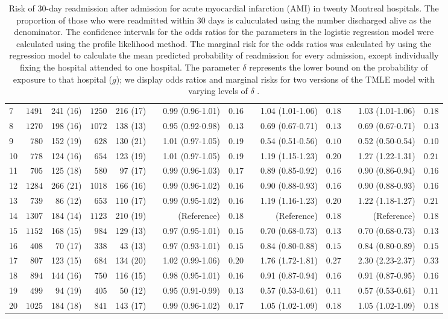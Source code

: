 \documentclass[]{article}\usepackage[]{graphicx}\usepackage[]{color}
\begin{document}
\begin{landscape}
\begin{table}[!tbp]
\begin{center}
\begin{tabular}{lrrrrcrrcrrcrr}
7&$1491$&241 (16)&$1250$&216 (17)&&0.99 (0.96-1.01)&$0.16$&&1.04 (1.01-1.06)&$0.18$&&1.03 (1.01-1.06)&$0.18$\tabularnewline
8&$1270$&198 (16)&$1072$&138 (13)&&0.95 (0.92-0.98)&$0.13$&&0.69 (0.67-0.71)&$0.13$&&0.69 (0.67-0.71)&$0.13$\tabularnewline
9&$ 780$&152 (19)&$ 628$&130 (21)&&1.01 (0.97-1.05)&$0.19$&&0.54 (0.51-0.56)&$0.10$&&0.52 (0.50-0.54)&$0.10$\tabularnewline
10&$ 778$&124 (16)&$ 654$&123 (19)&&1.01 (0.97-1.05)&$0.19$&&1.19 (1.15-1.23)&$0.20$&&1.27 (1.22-1.31)&$0.21$\tabularnewline
11&$ 705$&125 (18)&$ 580$&97 (17)&&0.99 (0.96-1.03)&$0.17$&&0.89 (0.85-0.92)&$0.16$&&0.90 (0.86-0.94)&$0.16$\tabularnewline
12&$1284$&266 (21)&$1018$&166 (16)&&0.99 (0.96-1.02)&$0.16$&&0.90 (0.88-0.93)&$0.16$&&0.90 (0.88-0.93)&$0.16$\tabularnewline
13&$ 739$&86 (12)&$ 653$&110 (17)&&0.99 (0.95-1.02)&$0.16$&&1.19 (1.16-1.23)&$0.20$&&1.22 (1.18-1.27)&$0.21$\tabularnewline
14&$1307$&184 (14)&$1123$&210 (19)&&(Reference)&$0.18$&&(Reference)&$0.18$&&(Reference)&$0.18$\tabularnewline
15&$1152$&168 (15)&$ 984$&129 (13)&&0.97 (0.95-1.01)&$0.15$&&0.70 (0.68-0.73)&$0.13$&&0.70 (0.68-0.73)&$0.13$\tabularnewline
16&$ 408$&70 (17)&$ 338$&43 (13)&&0.97 (0.93-1.01)&$0.15$&&0.84 (0.80-0.88)&$0.15$&&0.84 (0.80-0.89)&$0.15$\tabularnewline
17&$ 807$&123 (15)&$ 684$&134 (20)&&1.02 (0.99-1.06)&$0.20$&&1.76 (1.72-1.81)&$0.27$&&2.30 (2.23-2.37)&$0.33$\tabularnewline
18&$ 894$&144 (16)&$ 750$&116 (15)&&0.98 (0.95-1.01)&$0.16$&&0.91 (0.87-0.94)&$0.16$&&0.91 (0.87-0.95)&$0.16$\tabularnewline
19&$ 499$&94 (19)&$ 405$&50 (12)&&0.95 (0.91-0.99)&$0.13$&&0.57 (0.53-0.61)&$0.11$&&0.57 (0.53-0.61)&$0.11$\tabularnewline
20&$1025$&184 (18)&$ 841$&143 (17)&&0.99 (0.96-1.02)&$0.17$&&1.05 (1.02-1.09)&$0.18$&&1.05 (1.02-1.09)&$0.18$\tabularnewline
\hline
\end{tabular}

\caption{Risk of 30-day readmission after admission for  acute myocardial infarction (AMI)  in twenty Montreal hospitals.  The proportion of those who were readmitted within 30 days is caluculated using the number discharged alive as the denominator. The confidence intervals for the odds ratios for the parameters in the logistic regression model were calculated using the profile likelihood method.\supercite{cox_analysis_1970} The marginal risk for the odds ratios was calculated by using the regression model to calculate the mean predicted probability of readmission for every admission, except individually fixing the hospital attended to one hospital. The parameter $\delta$ represents the lower bound on the probability of exposure to that hospital ($g$); we display odds ratios and marginal risks for two versions of the TMLE model with varying levels of $\delta$ .\label{ami_table}}\end{center}


\end{table}
\end{landscape}
\end{document}
